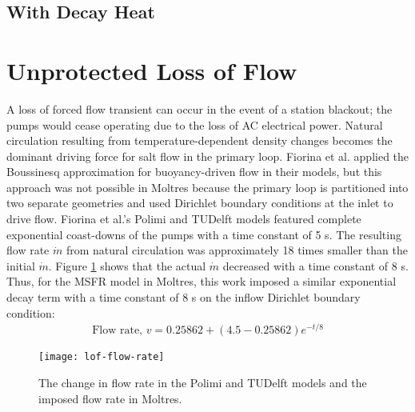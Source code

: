 \clearpage

\subsection{With Decay Heat}

\clearpage

\section{Unprotected Loss of Flow}

A loss of forced flow transient can occur in the event of a station
blackout; the pumps would cease operating due to the loss of AC electrical
power. Natural circulation resulting from temperature-dependent density
changes becomes the dominant driving force for salt flow in the primary loop.
Fiorina et al. \cite{fiorina_modelling_2014} applied the Boussinesq
approximation for buoyancy-driven flow in their models, but this approach was
not possible in Moltres because the primary loop is partitioned into two
separate geometries and used Dirichlet boundary
conditions at the inlet to drive flow. Fiorina et al.'s Polimi and TUDelft
models featured complete exponential coast-downs of the pumps with a time
constant of 5 s. The resulting flow rate $\dot{m}$ from natural circulation
was approximately 18 times smaller than the initial $\dot{m}$. Figure
\ref{fig:flowrate} shows that the actual $\dot{m}$ decreased with a time
constant of 8 s. Thus, for the \gls{MSFR} model in Moltres, this work imposed
a similar exponential decay term with a time constant of 8 s on the inflow
Dirichlet boundary condition:
%
\begin{align}
    \text{Flow rate, } v = 0.25862 + (4.5-0.25862) e^{-t/8} 
    \label{eq:flowrate}
\end{align}

\begin{figure}[htbp!]
    \centering
    \texttt{[image: lof-flow-rate]}
    \caption{The change in flow rate in the Polimi and TUDelft models and the
    imposed flow rate in Moltres.}
    \label{fig:flowrate}
\end{figure}

